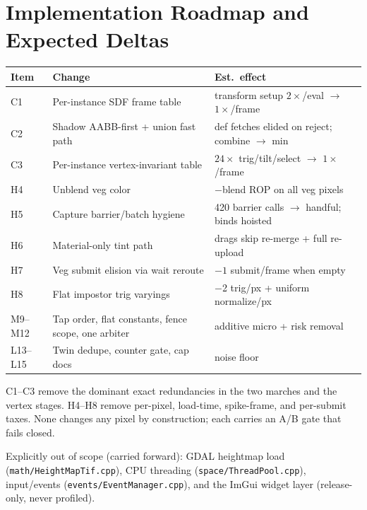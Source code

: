 \documentclass[11pt,a4paper]{article}
\begin{document}
\section{Implementation Roadmap and Expected Deltas}

\begin{table}[h]
\centering
\small
\begin{tabular}{@{}lp{5.8cm}p{5.6cm}@{}}
\toprule
\textbf{Item} & \textbf{Change} & \textbf{Est.\ effect} \\
\midrule
C1 & Per-instance SDF frame table & transform setup $2\times$/eval $\rightarrow$ $1\times$/frame \\
C2 & Shadow AABB-first + union fast path & def fetches elided on reject; combine $\rightarrow$ min \\
C3 & Per-instance vertex-invariant table & $24\times$ trig/tilt/select $\rightarrow$ $1\times$/frame \\
H4 & Unblend veg color & $-$blend ROP on all veg pixels \\
H5 & Capture barrier/batch hygiene & 420 barrier calls $\rightarrow$ handful; binds hoisted \\
H6 & Material-only tint path & drags skip re-merge + full re-upload \\
H7 & Veg submit elision via wait reroute & $-1$ submit/frame when empty \\
H8 & Flat impostor trig varyings & $-$2 trig/px + uniform normalize/px \\
M9--M12 & Tap order, flat constants, fence scope, one arbiter & additive micro + risk removal \\
L13--L15 & Twin dedupe, counter gate, cap docs & noise floor \\
\bottomrule
\end{tabular}
\end{table}

C1--C3 remove the dominant exact redundancies in the two marches and the
vertex stages. H4--H8 remove per-pixel, load-time, spike-frame, and
per-submit taxes. None changes any pixel by construction; each carries an
A/B gate that fails closed.

Explicitly out of scope (carried forward): GDAL heightmap load
(\texttt{math/HeightMapTif.cpp}), CPU threading
(\texttt{space/ThreadPool.cpp}), input/events
(\texttt{events/EventManager.cpp}), and the ImGui widget layer
(release-only, never profiled).
\end{document}
